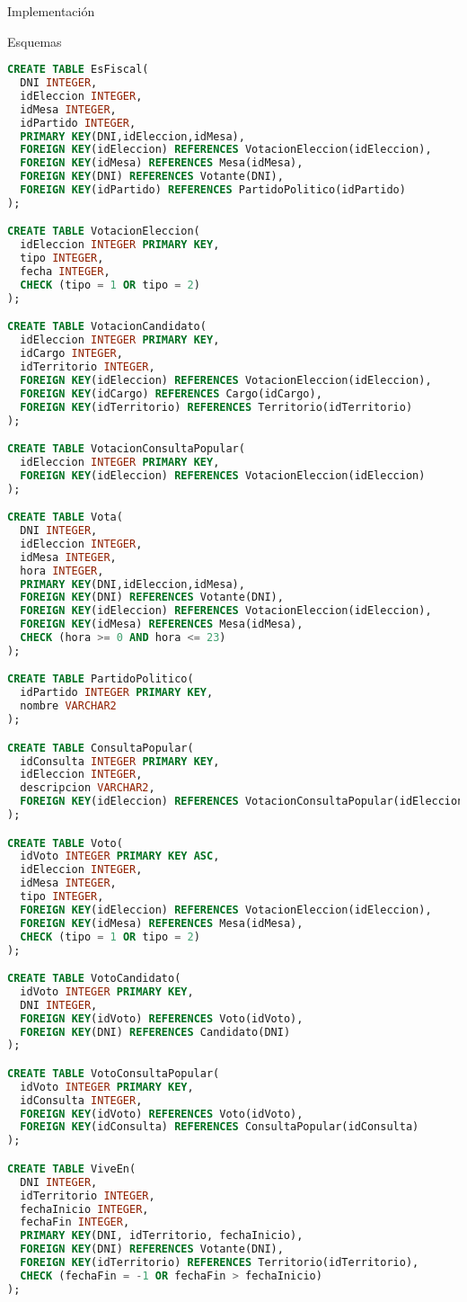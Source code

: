 \begin{section}{Implementaci\'on}
\begin{subsection}{Esquemas}
\begin{lstlisting}[language=SQL, basicstyle=\footnotesize]
CREATE TABLE EsFiscal(
  DNI INTEGER, 
  idEleccion INTEGER, 
  idMesa INTEGER, 
  idPartido INTEGER, 
  PRIMARY KEY(DNI,idEleccion,idMesa), 
  FOREIGN KEY(idEleccion) REFERENCES VotacionEleccion(idEleccion), 
  FOREIGN KEY(idMesa) REFERENCES Mesa(idMesa), 
  FOREIGN KEY(DNI) REFERENCES Votante(DNI), 
  FOREIGN KEY(idPartido) REFERENCES PartidoPolitico(idPartido)
);

CREATE TABLE VotacionEleccion(
  idEleccion INTEGER PRIMARY KEY, 
  tipo INTEGER,
  fecha INTEGER,
  CHECK (tipo = 1 OR tipo = 2)
);

CREATE TABLE VotacionCandidato(
  idEleccion INTEGER PRIMARY KEY, 
  idCargo INTEGER, 
  idTerritorio INTEGER, 
  FOREIGN KEY(idEleccion) REFERENCES VotacionEleccion(idEleccion), 
  FOREIGN KEY(idCargo) REFERENCES Cargo(idCargo), 
  FOREIGN KEY(idTerritorio) REFERENCES Territorio(idTerritorio)
);

CREATE TABLE VotacionConsultaPopular(
  idEleccion INTEGER PRIMARY KEY,
  FOREIGN KEY(idEleccion) REFERENCES VotacionEleccion(idEleccion)
);

CREATE TABLE Vota(
  DNI INTEGER, 
  idEleccion INTEGER, 
  idMesa INTEGER, 
  hora INTEGER, 
  PRIMARY KEY(DNI,idEleccion,idMesa), 
  FOREIGN KEY(DNI) REFERENCES Votante(DNI), 
  FOREIGN KEY(idEleccion) REFERENCES VotacionEleccion(idEleccion), 
  FOREIGN KEY(idMesa) REFERENCES Mesa(idMesa),
  CHECK (hora >= 0 AND hora <= 23)
);

CREATE TABLE PartidoPolitico(
  idPartido INTEGER PRIMARY KEY, 
  nombre VARCHAR2
);

CREATE TABLE ConsultaPopular(
  idConsulta INTEGER PRIMARY KEY,
  idEleccion INTEGER,
  descripcion VARCHAR2,
  FOREIGN KEY(idEleccion) REFERENCES VotacionConsultaPopular(idEleccion)
);

CREATE TABLE Voto(
  idVoto INTEGER PRIMARY KEY ASC,
  idEleccion INTEGER,
  idMesa INTEGER,
  tipo INTEGER,
  FOREIGN KEY(idEleccion) REFERENCES VotacionEleccion(idEleccion),
  FOREIGN KEY(idMesa) REFERENCES Mesa(idMesa),
  CHECK (tipo = 1 OR tipo = 2)
);

CREATE TABLE VotoCandidato(
  idVoto INTEGER PRIMARY KEY,
  DNI INTEGER,
  FOREIGN KEY(idVoto) REFERENCES Voto(idVoto),
  FOREIGN KEY(DNI) REFERENCES Candidato(DNI)
);

CREATE TABLE VotoConsultaPopular(
  idVoto INTEGER PRIMARY KEY,
  idConsulta INTEGER,
  FOREIGN KEY(idVoto) REFERENCES Voto(idVoto),
  FOREIGN KEY(idConsulta) REFERENCES ConsultaPopular(idConsulta)
);

CREATE TABLE ViveEn(
  DNI INTEGER,
  idTerritorio INTEGER,
  fechaInicio INTEGER,
  fechaFin INTEGER,
  PRIMARY KEY(DNI, idTerritorio, fechaInicio),
  FOREIGN KEY(DNI) REFERENCES Votante(DNI),
  FOREIGN KEY(idTerritorio) REFERENCES Territorio(idTerritorio),
  CHECK (fechaFin = -1 OR fechaFin > fechaInicio)
);


\end{lstlisting}
\end{subsection}
\end{section}

